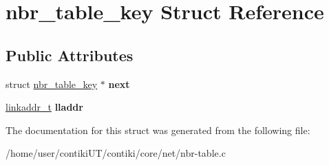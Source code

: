 \hypertarget{structnbr__table__key}{}\section{nbr\+\_\+table\+\_\+key Struct Reference}
\label{structnbr__table__key}
\subsection*{Public Attributes}
\begin{DoxyCompactItemize}
\item 
\hypertarget{structnbr__table__key_a2e89556192f925b6f956b90b7e023e60}{}struct \hyperlink{structnbr__table__key}{nbr\+\_\+table\+\_\+key} $\ast$ {\bfseries next}\label{structnbr__table__key_a2e89556192f925b6f956b90b7e023e60}

\item 
\hypertarget{structnbr__table__key_ac7932a07a2c8cc78f9a0263a6609e7a8}{}\hyperlink{unionlinkaddr__t}{linkaddr\+\_\+t} {\bfseries lladdr}\label{structnbr__table__key_ac7932a07a2c8cc78f9a0263a6609e7a8}

\end{DoxyCompactItemize}


The documentation for this struct was generated from the following file\+:\begin{DoxyCompactItemize}
\item 
/home/user/contiki\+U\+T/contiki/core/net/nbr-\/table.\+c\end{DoxyCompactItemize}
